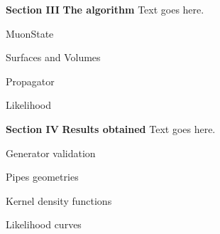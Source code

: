 \documentclass[8 pt]{beamer}
\begin{document}
\begin{frame}{}
\centering
	\huge{\textbf{\color{mycolor} Section III}} \newline
	\LARGE{\textbf{\color{mycolor} The algorithm \color{black}}} \vfill
Text goes here. \vfill
\end{frame}

\begin{frame}{MuonState}

\end{frame}

\begin{frame}{Surfaces and Volumes}

\end{frame}

\begin{frame}{Propagator}

\end{frame}

\begin{frame}{Likelihood}

\end{frame}












\begin{frame}{}
\centering
	\huge{\textbf{\color{mycolor} Section IV}} \newline
	\LARGE{\textbf{\color{mycolor} Results obtained \color{black}}} \vfill
Text goes here. \vfill
\end{frame}

\begin{frame}{Generator validation}

\end{frame}

\begin{frame}{Pipes geometries}

\end{frame}

\begin{frame}{Kernel density functions}

\end{frame}

\begin{frame}{Likelihood curves}

\end{frame}
\end{document}

